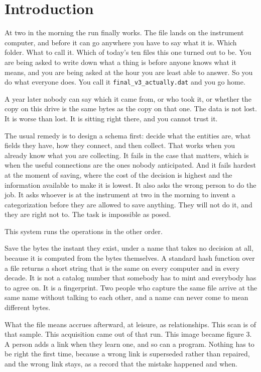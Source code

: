 \chapter*{Introduction}

At two in the morning the run finally works. The file lands on the instrument computer, and before it can go anywhere you have to say what it is. Which folder. What to call it. Which of today's ten files this one turned out to be. You are being asked to write down what a thing is before anyone knows what it means, and you are being asked at the hour you are least able to answer. So you do what everyone does. You call it \texttt{final\_v3\_actually.dat} and you go home.

A year later nobody can say which \labSampleWord{} it came from, or who took it, or whether the copy on this drive is the same bytes as the copy on that one. The data is not lost. It is worse than lost. It is sitting right there, and you cannot trust it.

The usual remedy is to design a schema first: decide what the entities are, what fields they have, how they connect, and then collect. That works when you already know what you are collecting. It fails in the case that matters, which is when the useful connections are the ones nobody anticipated. And it fails hardest at the moment of saving, where the cost of the decision is highest and the information available to make it is lowest. It also asks the wrong person to do the job. It asks whoever is at the instrument at two in the morning to invent a categorization before they are allowed to save anything. They will not do it, and they are right not to. The task is impossible as posed.

This system runs the operations in the other order.

Save the bytes the instant they exist, under a name that takes no decision at all, because it is computed from the bytes themselves. A standard hash function over a file returns a short string that is the same on every computer and in every decade. It is not a catalog number that somebody has to mint and everybody has to agree on. It is a fingerprint. Two people who capture the same file arrive at the same name without talking to each other, and a name can never come to mean different bytes.

What the file means accrues afterward, at leisure, as relationships. This scan is of that sample. This acquisition came out of that run. This image became figure 3. A person adds a link when they learn one, and so can a program. Nothing has to be right the first time, because a wrong link is superseded rather than repaired, and the wrong link stays, as a record that the mistake happened and when.

